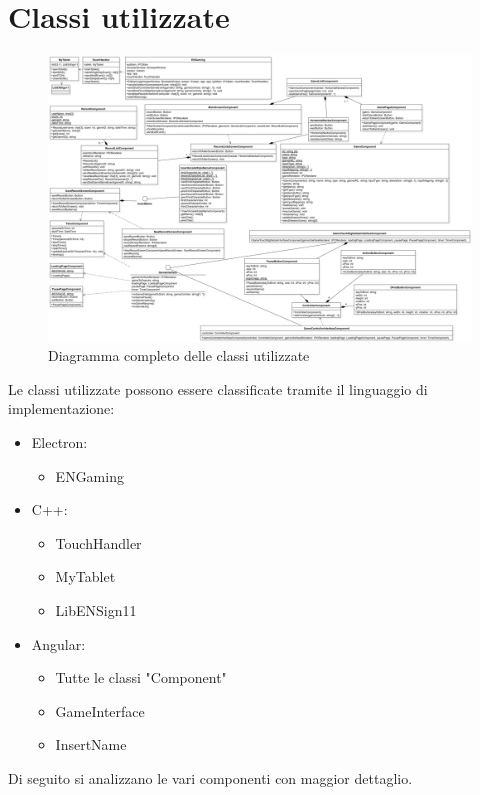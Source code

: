 \section{Classi utilizzate}
\begin{figure}[h]
    \centering
    \includegraphics[width=340pt]{ProgettazioneTecnica/ENGaming.png}
    \caption{Diagramma completo delle classi utilizzate}
    \label{fig:diagrammaCompleto}
\end{figure}
Le classi utilizzate possono essere classificate tramite il linguaggio di implementazione:
\begin{itemize}
    \item Electron: \begin{itemize}
        \item ENGaming
    \end{itemize}
    \item C++: \begin{itemize}
        \item TouchHandler
        \item MyTablet
        \item LibENSign11
    \end{itemize}
    \item Angular: \begin{itemize}
        \item Tutte le classi "Component"
        \item GameInterface
        \item InsertName
    \end{itemize}
\end{itemize}
Di seguito si analizzano le vari componenti con maggior dettaglio.
\newpage
